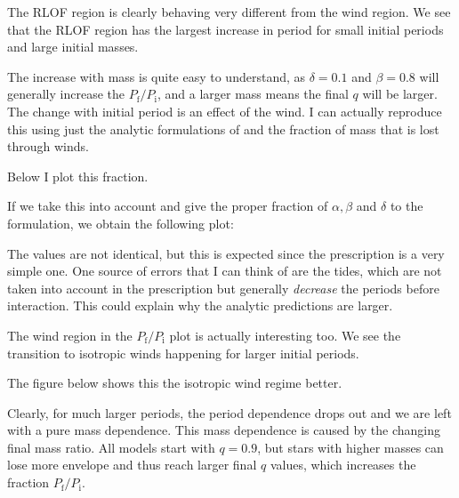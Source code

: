 \documentclass[a4paper,10pt]{article}
\begin{document}
\begin{figure}[ht]
	\centering
\end{figure}

\begin{figure}[ht]
	\centering
\end{figure}

The RLOF region is clearly behaving very different from the wind region.
We see that the RLOF region has the largest increase in period for small initial periods and large initial masses.

The increase with mass is quite easy to understand, as \(\delta =0.1\) and \(\beta =0.8\) will generally increase the \(P_\text{f} / P_\text{i}\), and a larger mass means the final
\(q\) will be larger.
The change with initial period is an effect of the wind.
I can actually reproduce this using just the analytic formulations of \citet{soberman1997} and the fraction of mass that is lost through
winds.

Below I plot this fraction.

\begin{figure}[ht]
	\centering
\end{figure}

If we take this into account and give the proper fraction of \(\alpha , \beta \) and \(\delta \) to the \citet{soberman1997} formulation,
we obtain the following plot:

\begin{figure}[ht]
	\centering
\end{figure}

The values are not identical, but this is expected since the \citet{soberman1997} prescription is a very simple one.
One source of errors that I can think of are the tides, which are not taken into account
in the \citet{soberman1997} prescription but generally \emph{decrease} the periods before interaction.
This could explain why the analytic predictions are larger.

\nextpage
The wind region in the \(P_\text{f} / P_\text{i}\) plot is actually interesting too.
We see the transition to isotropic winds happening for larger
initial periods.

The figure below shows this the isotropic wind regime better.
\begin{figure}[ht]
	\centering
\end{figure}

Clearly, for much larger periods, the period dependence drops out and we are left with a pure mass dependence.
This mass dependence is caused by the changing final mass ratio.
All models start with \(q=0.9\), but
stars with higher masses can lose more envelope and thus reach larger final \(q\) values, which increases the
fraction \(P_\text{f} / P_\text{i}\).
\end{document}
